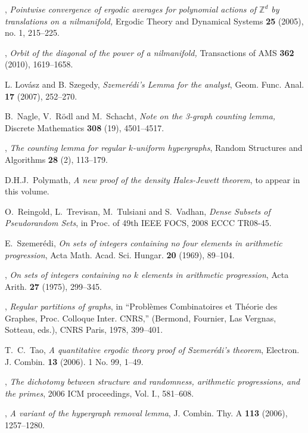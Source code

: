 \documentclass[11pt,reqno]{amsart}
\numberwithin{equation}{section}
\theoremstyle{plain}
\theoremstyle{definition}
\newcommand\Z{\mathbb{Z}}
\newcommand\1{{\bf 1}}
\newcommand\2{{\bf 2}}
\begin{document}
\begin{thebibliography}{99}
 \bysame, \emph{Pointwise convergence of ergodic averages for polynomial actions of $\Z^d$ by translations on a nilmanifold,} Ergodic Theory and Dynamical Systems \textbf{25} (2005), no. 1, 215--225.

 \bysame, \emph{Orbit of the diagonal of the power of a nilmanifold,} Transactions of AMS \textbf{362} (2010), 1619--1658.

L. Lov\'asz and B. Szegedy, \emph{Szemer\'edi's Lemma for the analyst}, Geom. Func. Anal. \textbf{17} (2007), 252--270. 

B.~Nagle, V.~R\"odl and M.~Schacht, \emph{Note on the 3-graph counting lemma,} Discrete Mathematics \textbf{308} (19), 4501--4517.

\bysame, \emph{The counting lemma for regular $k$-uniform hypergraphs}, Random
Structures and Algorithms \textbf{28} (2), 113--179.

D.H.J.~Polymath, \emph{A new proof of the density Hales-Jewett theorem}, to appear in this volume.

O.~Reingold, L.~Trevisan, M.~Tulsiani and S.~Vadhan, \emph{Dense Subsets of Pseudorandom Sets}, in Proc. of 49th IEEE FOCS, 2008
ECCC TR08-45.

E.~Szemer\'edi, \emph{On sets of integers containing no four elements in arithmetic progression},
Acta Math. Acad. Sci. Hungar. \textbf{20} (1969), 89--104.

\bysame, \emph{On sets of integers containing no $k$ elements in arithmetic progression},
Acta Arith. \textbf{27} (1975), 299--345.

\bysame, \emph{Regular partitions of graphs}, in ``Probl\`emes Combinatoires et Th\'eorie des Graphes, Proc. Colloque Inter. CNRS,'' (Bermond, Fournier, Las Vergnas, Sotteau, eds.), CNRS Paris, 1978, 399--401.

T.~C.~Tao, \emph{A quantitative ergodic theory proof of Szemer\'edi's theorem}, Electron. J. Combin. \textbf{13} (2006). 1 No. 99, 1--49.

\bysame, \emph{The dichotomy between structure and randomness, arithmetic progressions, and the primes}, 2006 ICM proceedings, Vol. I., 581--608.

\bysame, \emph{A variant of the hypergraph removal lemma}, J. Combin. Thy. A \textbf{113} (2006), 1257--1280.


\end{thebibliography}
\end{document}
